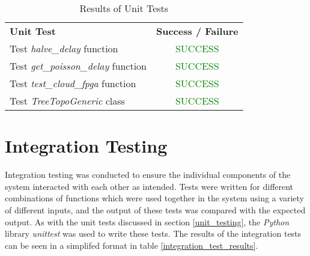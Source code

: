 \begin{table}[t]
  \caption{Results of Unit Tests}
  \begin{center}
    \begin{tabularx}{\textwidth}{|Y|c|} \hline
      \textbf{Unit Test} & \textbf{Success / Failure} \\ \thickhline
      Test \textit{halve\_delay} function & \textcolor{green}{SUCCESS} \\ \hline
      Test \textit{get\_poisson\_delay} function & \textcolor{green}{SUCCESS} \\ \hline
      Test \textit{test\_cloud\_fpga} function & \textcolor{green}{SUCCESS} \\ \hline
      Test \textit{TreeTopoGeneric} class & \textcolor{green}{SUCCESS} \\ \hline
    \end{tabularx}
  \end{center}
  \label{unit_test_results}
\end{table}

\section{Integration Testing}
\label{integration_testing}
Integration testing was conducted to ensure the individual components of the system interacted with each other as intended.
Tests were written for different combinations of functions which were used together in the system using a variety of different inputs, and the output of these tests was compared with the expected output.
As with the unit tests discussed in section \ref{unit_testing}, the \textit{Python} library \textit{unittest} was used to write these tests.
The results of the integration tests can be seen in a simplifed format in table \ref{integration_test_results}.

